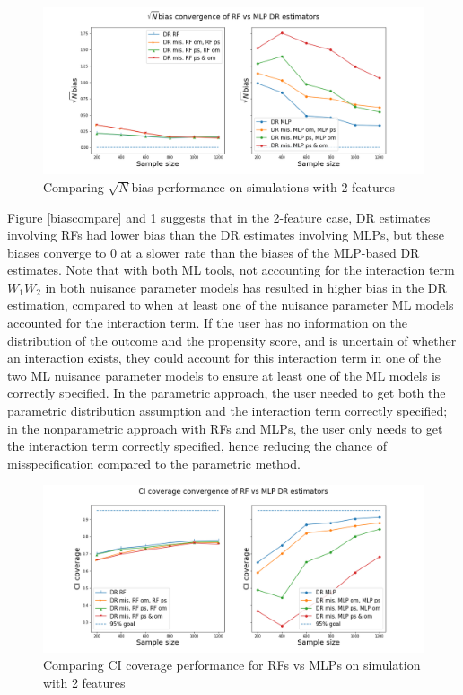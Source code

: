 \documentclass[12pt,twoside]{article}
\begin{document}
\begin{figure}[h!]
    \centering
    \includegraphics[width = 0.9\columnwidth]{figures/sqrtncompare.png}
    \caption{Comparing $\sqrt{N}$bias performance on simulations with 2 features}
    \label{sqrtncompare}
\end{figure}

Figure \ref{biascompare} and \ref{sqrtncompare} suggests that in the 2-feature case, DR estimates involving RFs had lower bias than the DR estimates involving MLPs, but these biases converge to 0 at a slower rate than the biases of the MLP-based DR estimates. Note that with both ML tools, not accounting for the interaction term $W_1W_2$ in both nuisance parameter models has resulted in higher bias in the DR estimation, compared to when at least one of the nuisance parameter ML models accounted for the interaction term. If the user has no information on the distribution of the outcome and the propensity score, and is uncertain of whether an interaction exists, they could account for this interaction term in one of the two ML nuisance parameter models to ensure at least one of the ML models is correctly specified. In the parametric approach, the user needed to get both the parametric distribution assumption and the interaction term correctly specified; in the nonparametric approach with RFs and MLPs, the user only needs to get the interaction term correctly specified, hence reducing the chance of misspecification compared to the parametric method.

\begin{figure}[h!]
    \centering
    \includegraphics[width = 0.9\columnwidth]{figures/CIcompare.png}
    \caption{Comparing CI coverage performance for RFs vs MLPs on simulation with 2 features}
    \label{CIcompare}
\end{figure}
 
\end{document}
